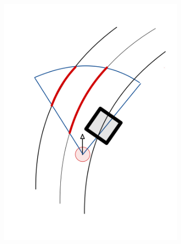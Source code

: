 \begin{figure}
	\centering
	\begin{subfigure}{.24\linewidth}
		\includegraphics[width=\textwidth]{Pictures/road detection obstacle}
		

\end{subfigure}
\end{figure}
